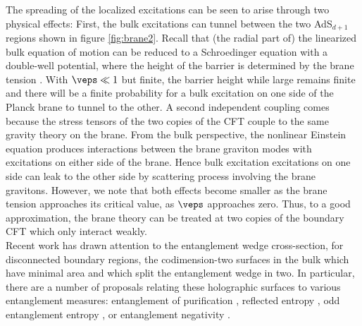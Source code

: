 The spreading of the localized excitations can be seen to arise through two physical effects: First, the bulk excitations can tunnel between the two AdS$_{d+1}$ regions shown in figure \ref{fig:brane2}. Recall that (the radial part of) the linearized bulk equation of motion can be reduced to a Schroedinger equation with a double-well potential, where the height of the barrier is determined by the brane tension \cite{Karch:2000ct}. With $\veps\ll1$ but finite, the barrier height while large remains finite and there will be a finite probability for a bulk excitation on one side of the Planck brane to tunnel to the other. A second independent coupling comes because the stress tensors of the two copies of the CFT couple to the same gravity theory on the brane. From the bulk perspective, the nonlinear Einstein equation produces interactions between the brane graviton modes with excitations on either side of the brane. Hence bulk excitation excitations on one side can leak to the other side by scattering process involving the brane gravitons. However, we note that both effects become smaller as the brane tension approaches its critical value, \ie as $\veps$ approaches zero. Thus, to a good approximation, the brane theory can be treated at two copies of the boundary CFT which only interact weakly. \\


 Recent work \cite{Takayanagi:2017knl,Nguyen:2017yqw} has drawn attention to
the entanglement wedge cross-section, \ie for disconnected boundary regions, the codimension-two surfaces in the bulk which have minimal area and which split the entanglement wedge in two. In particular, there are a number of proposals relating these holographic surfaces to various entanglement measures: entanglement of purification \cite{Takayanagi:2017knl,Nguyen:2017yqw}, reflected entropy \cite{Dutta:2019gen},  odd entanglement entropy \cite{Tamaoka:2018ned,Kusuki:2019evw,Kusuki:2019rbk}, or entanglement negativity \cite{Kudler-Flam:2018qjo,Kusuki:2019zsp}. 

